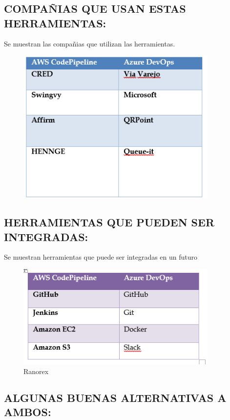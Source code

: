 \documentclass[12pt,letterpaper]{article}
\begin{document}
\subsection{COMPAÑIAS QUE USAN ESTAS HERRAMIENTAS:}
Se muestran las compañias que utilizan las herramientas.

\begin{figure}[h]
    \begin{center}
    \includegraphics[width=10cm]{./Imagenes/img4.png}
    
    \label{rg6}
    \end{center}
    \end{figure}

\subsection{HERRAMIENTAS QUE PUEDEN SER INTEGRADAS:}
Se muestran herramientas que puede ser integradas en un futuro
\begin{figure}[h]
    \begin{center}
    \includegraphics[width=10cm]{./Imagenes/img5.png}
    \caption{Ranorex}
    \label{rg7}
    \end{center}
    \end{figure}
\subsection{ALGUNAS BUENAS ALTERNATIVAS A AMBOS:}
\end{document}
